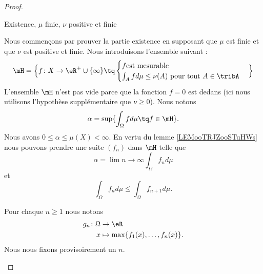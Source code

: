 \begin{proof}
										\begin{center}
										Existence, \( \mu\) finie, \( \nu\) positive et finie
										\end{center}
										Nous commençons par prouver la partie existence en supposant que \( \mu\) est finie et que \( \nu\) est positive et finie. Nous introduisons l'ensemble suivant :
										\begin{equation}
										\mH=\Big\{
										f \colon X\to \eR^+\cup\{ \infty \} \tq
										\begin{cases}
										f                       \text{est mesurable } \\
											\int_Afd\mu\leq \nu(A)  \text{ pour tout  }A\in\tribA
											\end{cases}
											\Big\}
											\end{equation}
											L'ensemble \( \mH\) n'est pas vide parce que la fonction \( f=0\) est dedans (ici nous utilisons l'hypothèse supplémentaire que \( \nu\geq 0\)). Nous notons
											\begin{equation}
											\alpha=\sup\{ \int_{\Omega}fd\mu\tq f\in\mH \}.
											\end{equation}
											Nous avons \( 0\leq \alpha\leq \mu(X)<\infty\). En vertu du lemme \ref{LEMooTRJZooSTuHWs} nous pouvons prendre une suite \( (f_n)\) dans \( \mH\) telle que
											\begin{equation}
											\alpha=\lim{n\to\infty }\int_{\Omega}f_nd\mu
											\end{equation}
											et
											\begin{equation}
											\int_{\Omega}f_nd\mu\leq \int_{\Omega}f_{n+1}d\mu.
											\end{equation}

											\begin{subproof}

											Pour chaque \( n\geq 1\) nous notons
											\begin{equation}
											\begin{aligned}
											g_n\colon \Omega & \to \eR                                  \\
												x                & \mapsto \max\{ f_1(x),\ldots, f_n(x) \}.
												\end{aligned}
												\end{equation}
												Nous nous fixons provisoirement un \( n\).


\end{subproof}
\end{proof}
